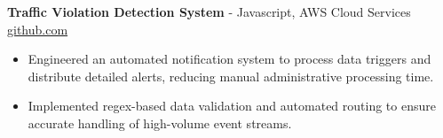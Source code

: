 \documentclass[11pt]{article}       %
\begin{document}

\textbf{Traffic Violation Detection System}{ - Javascript, AWS Cloud Services} \hfill \href{https://github.com/Monica20030707/AWS_rekonigition-N-read-database}{github.com} \\
\vspace{-9pt}
\begin{itemize}
  \item Engineered an automated notification system to process data triggers and distribute detailed alerts, reducing manual administrative processing time.
  \item Implemented regex-based data validation and automated routing to ensure accurate handling of high-volume event streams.
\end{itemize}

\end{document}
